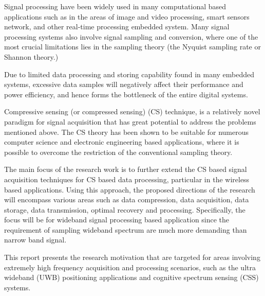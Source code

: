 \indent Signal processing have been widely used in many computational based applications such as in the areas of image and video processing, smart sensors network, and other real-time processing embedded system. Many signal processing systems also involve signal sampling and conversion, where one of the most crucial limitations lies in the sampling theory (the Nyquist sampling rate or Shannon theory.) 

Due to limited data processing and storing capability found in many embedded systems, excessive data samples will negatively affect their performance and power efficiency, and hence forms the bottleneck of the entire digital systems.

Compressive sensing (or compressed sensing) (CS) technique, is a relatively novel paradigm for signal acquisition that has great potential to address the problems mentioned above. The CS theory has been shown to be suitable for numerous computer science and electronic engineering based applications, where it is possible to overcome the restriction of the conventional sampling theory.

The main focus of the research work is to further extend the CS based signal acquisition techniques for CS based data processing, particular in the wireless based applications. Using this approach, the proposed directions of the research will encompass various areas such as data compression, data acquisition, data storage, data transmission, optimal recovery and processing. Specifically, the focus will be for wideband signal processing based application since the requirement of sampling wideband spectrum are much more demanding than narrow band signal. 

This report presents the research motivation that are targeted for areas involving extremely high frequency acquisition and processing scenarios, such as the ultra wideband (UWB) positioning applications and cognitive spectrum sensing (CSS) systems.

